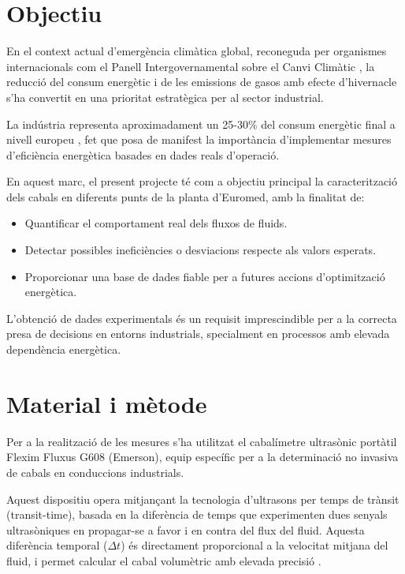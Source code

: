 \documentclass[11pt]{article}
\begin{document}
\section{Objectiu}

En el context actual d'emergència climàtica global, reconeguda per organismes internacionals com el Panell Intergovernamental sobre el Canvi Climàtic \cite{EU2023}, la reducció del consum energètic i de les emissions de gasos amb efecte d'hivernacle s'ha convertit en una prioritat estratègica per al sector industrial.

La indústria representa aproximadament un 25-30\% del consum energètic final a nivell europeu \cite{IPCC2023}, fet que posa de manifest la importància d'implementar mesures d'eficiència energètica basades en dades reals d'operació.

En aquest marc, el present projecte té com a objectiu principal la caracterització dels cabals en diferents punts de la planta d'Euromed, amb la finalitat de:

\begin{itemize}
    \item Quantificar el comportament real dels fluxos de fluids.
    \item Detectar possibles ineficiències o desviacions respecte als valors esperats.
    \item Proporcionar una base de dades fiable per a futures accions d'optimització
          energètica.
\end{itemize}


L'obtenció de dades experimentals és un requisit imprescindible per a la correcta presa de decisions en entorns industrials, specialment en processos amb elevada dependència energètica.

\section{Material i mètode}

Per a la realització de les mesures s'ha utilitzat el cabalímetre ultrasònic portàtil Flexim Fluxus G608 (Emerson), equip específic per a la determinació no invasiva de cabals en conduccions industrials.

Aquest dispositiu opera mitjançant la tecnologia d'ultrasons per temps de trànsit (transit-time), basada en la diferència de temps que experimenten dues senyals ultrasòniques en propagar-se a favor i en contra del flux del fluid. Aquesta diferència temporal ($\Delta t$) és directament proporcional a la velocitat mitjana del fluid, i permet calcular el cabal volumètric amb elevada
precisió \cite{Emerson2024}.
\end{document}
